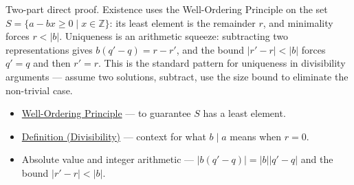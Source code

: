 \begin{remark*}
Two-part direct proof. Existence uses the Well-Ordering Principle on the set
$S = \{a - bx \geq 0 \mid x \in \mathbb{Z}\}$: its least element is the
remainder $r$, and minimality forces $r < |b|$.
Uniqueness is an arithmetic squeeze: subtracting two representations gives
$b(q'-q) = r-r'$, and the bound $|r'-r| < |b|$ forces $q' = q$ and then $r' = r$.
This is the standard pattern for uniqueness in divisibility arguments —
assume two solutions, subtract, use the size bound to eliminate the non-trivial case.

\end{remark*}

\begin{remark*}[Dependencies]
\begin{itemize}
  \item \hyperref[thm:wop]{Well-Ordering Principle} — to guarantee $S$ has a
        least element.
  \item \hyperref[def:divisibility]{Definition (Divisibility)} — context for
        what $b \mid a$ means when $r = 0$.
  \item Absolute value and integer arithmetic — $|b(q'-q)| = |b||q'-q|$ and
        the bound $|r'-r| < |b|$.
\end{itemize}
\end{remark*}
